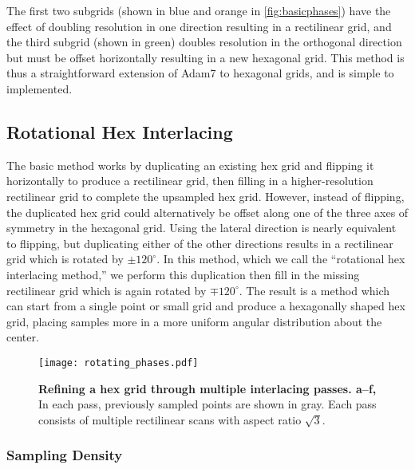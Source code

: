 \documentclass[aip, amsmath, amssymb, nobibnotes, nofootinbib, citeautoscript, reprint, superscriptaddress]{revtex4-2}
\begin{document}
    The first two subgrids (shown in blue and orange in \autoref{fig:basicphases}) have the effect of doubling resolution in one direction
    resulting in a rectilinear grid, and the third subgrid (shown in green) doubles resolution in the orthogonal direction but must be
    offset horizontally resulting in a new hexagonal grid.
    This method is thus a straightforward extension of Adam7 to hexagonal grids, and
    is simple to implemented.


    \subsection{\label{ssec:triple-grid-interlacing}Rotational Hex Interlacing}

    The basic method works by duplicating an existing hex grid and flipping it horizontally to produce a rectilinear grid, then filling in a higher-resolution rectilinear grid to complete the upsampled hex grid.
    However, instead of flipping, the duplicated hex grid could alternatively be offset along one of the three axes of symmetry in the hexagonal grid.
    Using the lateral direction is nearly equivalent to flipping, but duplicating either of the other directions results in a rectilinear grid which is rotated by $\pm 120^{\circ}$.
    In this method, which we call the ``rotational hex interlacing method,'' we perform this duplication then fill in the missing rectilinear grid which is again rotated by $\mp 120^{\circ}$.
    The result is a method which can start from a single point or small grid and produce a hexagonally shaped hex grid, placing samples more in a more uniform angular distribution about the center.

    \begin{figure*}
        
        \texttt{[image: rotating\_phases.pdf]}
        \caption{
            \label{fig:rotatingphases} 
            \textbf{Refining a hex grid through multiple interlacing passes. a--f, }
            In each pass, previously sampled points are shown in gray.
            Each pass consists of multiple rectilinear scans with aspect ratio $\sqrt{3}$.
            }
    \end{figure*}

    \subsubsection{\label{sec:density}Sampling Density}
\end{document}

